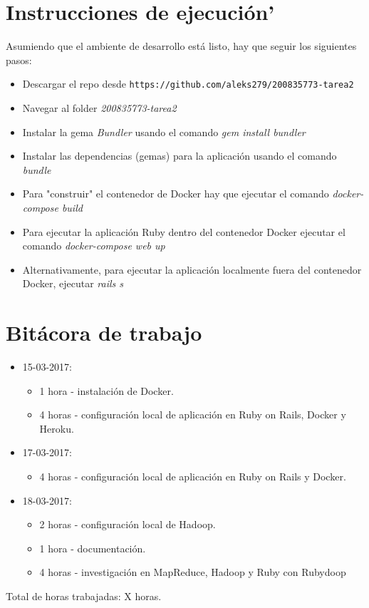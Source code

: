 \documentclass{article}
\begin{document}
\section{Instrucciones de ejecuci\'on'}
Asumiendo que el ambiente de desarrollo est\'a listo, hay que seguir los siguientes pasos:
\begin{itemize}
  \item Descargar el repo desde \texttt{https://github.com/aleks279/200835773-tarea2}
  \item Navegar al folder \emph{200835773-tarea2}
  \item Instalar la gema \emph{Bundler} usando el comando \emph{gem install bundler}
  \item Instalar las dependencias (gemas) para la aplicaci\'on usando el comando \emph{bundle}
  \item Para "construir" el contenedor de Docker hay que ejecutar el comando \emph{docker-compose build}
  \item Para ejecutar la aplicaci\'on Ruby dentro del contenedor Docker ejecutar el comando \emph{docker-compose web up}
  \item Alternativamente, para ejecutar la aplicaci\'on localmente fuera del contenedor Docker, ejecutar \emph{rails s}
\end{itemize}

\section{Bit\'acora de trabajo}
\begin{itemize}
  \item 15-03-2017:
  \begin{itemize}
    \item 1 hora - instalaci\'on de Docker.
    \item 4 horas - configuraci\'on local de aplicaci\'on en Ruby on Rails, Docker y Heroku.
  \end{itemize}
  \item 17-03-2017:
  \begin{itemize}
    \item 4 horas - configuraci\'on local de aplicaci\'on en Ruby on Rails y Docker.
  \end{itemize}
  \item 18-03-2017:
  \begin{itemize}
    \item 2 horas - configuraci\'on local de Hadoop.
    \item 1 hora - documentaci\'on.
    \item 4 horas - investigaci\'on en MapReduce, Hadoop y Ruby con Rubydoop
  \end{itemize}
\end{itemize}
Total de horas trabajadas: X horas.
\end{document}
